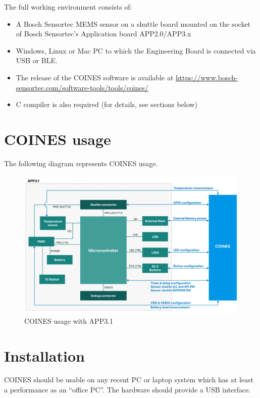 \documentclass[11pt,headings=small]{scrartcl}
\begin{document}
The full working environment consists of:
\begin{itemize}
	\item A Bosch Sensortec MEMS sensor on a shuttle board mounted on the socket of Bosch Sensortec's Application board APP2.0/APP3.x
	\item Windows, Linux or Mac PC to which the Engineering Board is connected via USB or BLE.
	\item The release of the COINES software is available at \url{https://www.bosch-sensortec.com/software-tools/tools/coines/}
	\item C compiler is also required (for details, see sections below)
\end{itemize}

\section{COINES usage}
The following diagram represents COINES usage.
\begin{figure}[H]
	\begin{center}
		\includegraphics[width=1.1\textwidth]{coinesAPI_images/COINES_block_diagram.png}
		\caption{COINES usage with APP3.1}
	\end{center}
\end{figure}

\section{Installation}

COINES should be usable on any recent PC or laptop system which has at least a performance as an “office PC”. The hardware should provide a USB interface.
\end{document}
